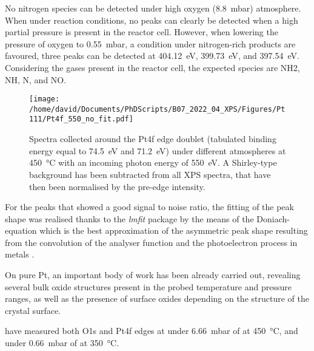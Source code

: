 No nitrogen species can be detected under high oxygen (\qty{8.8}{\milli\bar}) atmosphere.
When under reaction conditions, no peaks can clearly be detected when a high partial pressure is present in the reactor cell.
However, when lowering the pressure of oxygen to \qty{0.55}{\milli\bar}, a condition under nitrogen-rich products are favoured, three peaks can be detected at \qty{404.12}{\eV}, \qty{399.73}{\eV}, and \qty{397.54}{\eV}.
Considering the gases present in the reactor cell, the expected species are NH2, NH, N, and NO.


\begin{figure}[!htb]
    \centering
    \texttt{[image: /home/david/Documents/PhDScripts/B07\_2022\_04\_XPS/Figures/Pt111/Pt4f\_550\_no\_fit.pdf]}
    \caption{
        Spectra collected around the Pt4f edge doublet (tabulated binding energy equal to \qty{74.5}{\eV} and \qty{71.2}{\eV}) under different atmospheres at \qty{450}{\degreeCelsius} with an incoming photon energy of \qty{550}{\eV}.
        A Shirley-type background has been subtracted from all XPS spectra, that have then been normalised by the pre-edge intensity.
    }
    \label{fig:Pt4fPt111}
\end{figure}

For the peaks that showed a good signal to noise ratio, the fitting of the peak shape was realised thanks to the \textit{lmfit} \parencite{Newville2016} package by the means of the Doniach-equation which is the best approximation of the asymmetric peak shape resulting from the convolution of the analyser function and the photoelectron process in metals \parencite{Doniach_1970}.

On pure Pt, an important body of work has been already carried out, revealing several bulk oxide structures present in the probed temperature and pressure ranges, as well as the presence of surface oxides depending on the structure of the crystal surface.

\cite{Miller2011} have measured both O1s and Pt4f edges at under \qty{6.66}{\milli\bar} of  at \qty{450}{\degreeCelsius}, and under \qty{0.66}{\milli\bar} of  at \qty{350}{\degreeCelsius}.